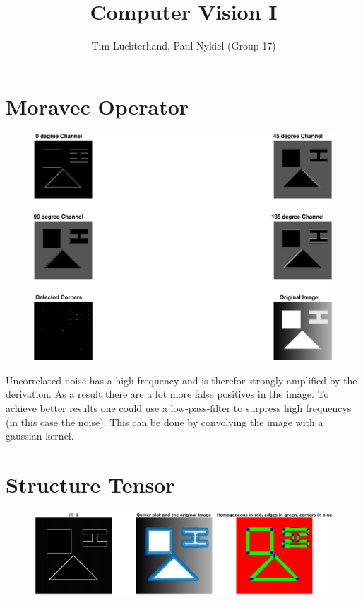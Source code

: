 \documentclass[DIN, pagenumber=false, fontsize=11pt, parskip=half]{scrartcl}
\title{Computer Vision I}
\author{Tim Luchterhand, Paul Nykiel (Group 17)}
\begin{document}
    \maketitle
    \section{Moravec Operator}
    
    \begin{figure}[H]
        \centering
        \includegraphics[width=\textwidth]{sh04ex01.eps}
    \end{figure}
    Uncorrelated noise has a high frequency and is therefor strongly amplified by the derivation. As a result there are a lot more false positives in the image.
    To achieve better results one could use a low-pass-filter to surpress high frequencys (in this case the noise). This can be done by convolving the image with
    a gaussian kernel.

    \section{Structure Tensor}
    
    \begin{figure}[H]
        \centering
        \includegraphics[width=\textwidth]{sh04ex02.eps}
    \end{figure}
\end{document}
